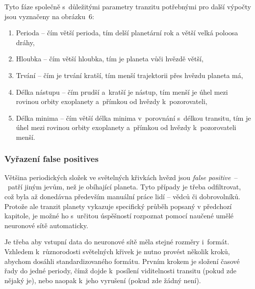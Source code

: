 \documentclass[a4paper,12pt]{article}
\begin{document}
Tyto fáze společně s~důležitými parametry tranzitu potřebnými pro další výpočty jsou vyznačeny na obrázku~6:

\begin{enumerate}[label=\Alph*.]
\item Perioda -- čím větší perioda, tím delší planetární rok a větší velká poloosa dráhy,
\item Hloubka -- čím větší hloubka, tím je planeta vůči hvězdě větší,
\item Trvání -- čím je trvání kratší, tím menší trajektorii přes hvězdu planeta má,
\item Délka nástupu -- čím prudší a~kratší je nástup, tím menší je úhel mezi rovinou orbity exoplanety a~přímkou od hvězdy k~pozorovateli,
\item Délka minima -- čím větší délka minima v~porovnání s~délkou transitu, tím je úhel mezi rovinou orbity exoplanety a~přímkou od hvězdy k~pozorovateli menší.
\end{enumerate}

\subsubsection{Vyřazení false positives}

Většina periodických složek ve světelných křivkách hvězd jsou \emph{false positive}~--~patří jiným jevům, než je obíhající planeta. Tyto případy je třeba odfiltrovat, což byla až donedávna především manuální práce lidí -- vědců či dobrovolníků. Protože ale tranzit planety vykazuje specifický průběh popsaný v předchozí kapitole, je možné ho s~určitou úspěšností rozpoznat pomocí naučené umělé neuronové sítě automaticky.~\cite{kepler80}

\begin{multicols}{2}
\end{multicols}

\begin{multicols}{2}
\end{multicols}


Je třeba aby vstupní data do neuronové sítě měla stejné rozměry i~formát. Vzhledem k~různorodosti světelných křivek je nutno provést několik kroků, abychom dosáhli standardizovaného formátu. Prvním krokem je složení časové řady do jedné periody, čímž dojde k~posílení viditelnosti transitu (pokud zde nějaký je), nebo naopak k~jeho vyrušení (pokud zde žádný není).~\cite{kepler80}
\end{document}
